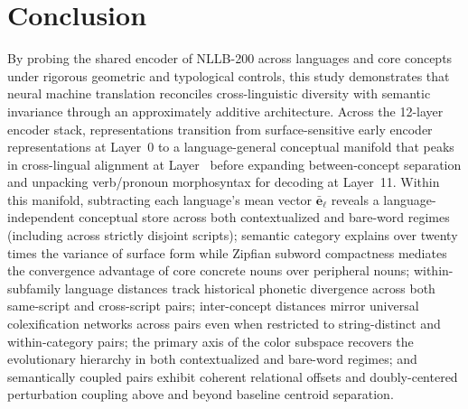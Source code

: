 \section{Conclusion}
\label{sec:conclusion}

By probing the shared encoder of NLLB-200 across \NumLanguages{} languages and \NumConcepts{} core concepts under rigorous geometric and typological controls, this study demonstrates that neural machine translation reconciles cross-linguistic diversity with semantic invariance through an approximately additive architecture.
Across the 12-layer encoder stack, representations transition from surface-sensitive early encoder representations at Layer~0 to a language-general conceptual manifold that peaks in cross-lingual alignment at Layer~\LayerwisePeakLayer{} before expanding between-concept separation and unpacking verb/pronoun morphosyntax for decoding at Layer~11.
Within this manifold, subtracting each language's mean vector $\bar{\mathbf{e}}_\ell$ reveals a language-independent conceptual store across both contextualized and bare-word regimes (including across strictly disjoint scripts); semantic category explains over twenty times the variance of surface form while Zipfian subword compactness mediates the convergence advantage of core concrete nouns over peripheral nouns; within-subfamily language distances track historical phonetic divergence across both same-script and cross-script pairs; inter-concept distances mirror universal colexification networks across \ColexNumPairs{} pairs even when restricted to string-distinct and within-category pairs; the primary axis of the color subspace recovers the \citet{berlin1969} evolutionary hierarchy in both contextualized and bare-word regimes; and semantically coupled pairs exhibit coherent relational offsets and doubly-centered perturbation coupling above and beyond baseline centroid separation.

